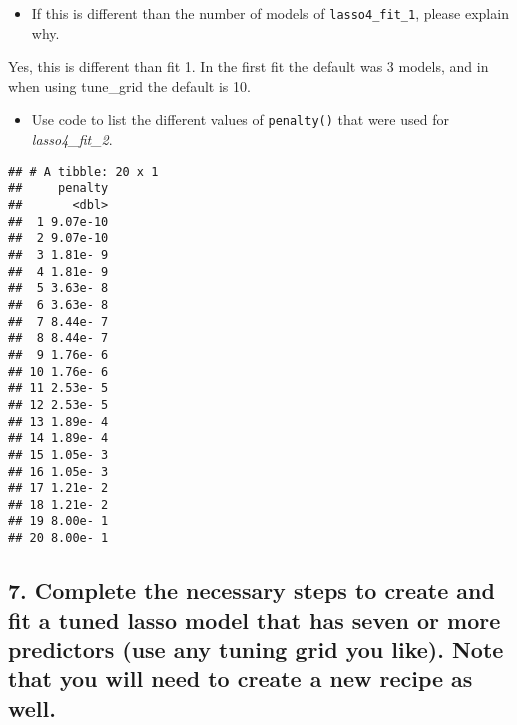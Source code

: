 \documentclass[
]{article}
\newenvironment{Shaded}{\begin{snugshade}}{\end{snugshade}}
\newcommand{\DecValTok}[1]{\textcolor[rgb]{0.00,0.00,0.81}{#1}}
\newcommand{\KeywordTok}[1]{\textcolor[rgb]{0.13,0.29,0.53}{\textbf{#1}}}
\newcommand{\NormalTok}[1]{#1}
\newcommand{\OperatorTok}[1]{\textcolor[rgb]{0.81,0.36,0.00}{\textbf{#1}}}
\newcommand{\StringTok}[1]{\textcolor[rgb]{0.31,0.60,0.02}{#1}}
\providecommand{\tightlist}{%
  \setlength{\itemsep}{0pt}\setlength{\parskip}{0pt}}
\begin{document}
\begin{itemize}
\tightlist
\item
  If this is different than the number of models of
  \texttt{lasso4\_fit\_1}, please explain why.
\end{itemize}

Yes, this is different than fit 1. In the first fit the default was 3
models, and in when using tune\_grid the default is 10.

\begin{itemize}
\tightlist
\item
  Use code to list the different values of \texttt{penalty()} that were
  used for \emph{lasso4\_fit\_2}.
\end{itemize}

\begin{Shaded}
\end{Shaded}

\begin{verbatim}
## # A tibble: 20 x 1
##     penalty
##       <dbl>
##  1 9.07e-10
##  2 9.07e-10
##  3 1.81e- 9
##  4 1.81e- 9
##  5 3.63e- 8
##  6 3.63e- 8
##  7 8.44e- 7
##  8 8.44e- 7
##  9 1.76e- 6
## 10 1.76e- 6
## 11 2.53e- 5
## 12 2.53e- 5
## 13 1.89e- 4
## 14 1.89e- 4
## 15 1.05e- 3
## 16 1.05e- 3
## 17 1.21e- 2
## 18 1.21e- 2
## 19 8.00e- 1
## 20 8.00e- 1
\end{verbatim}

\hypertarget{complete-the-necessary-steps-to-create-and-fit-a-tuned-lasso-model-that-has-seven-or-more-predictors-use-any-tuning-grid-you-like.-note-that-you-will-need-to-create-a-new-recipe-as-well.}{%
\subsection{7. Complete the necessary steps to create and fit a tuned
lasso model that has seven or more predictors (use any tuning grid you
like). Note that you will need to create a new recipe as
well.}\label{complete-the-necessary-steps-to-create-and-fit-a-tuned-lasso-model-that-has-seven-or-more-predictors-use-any-tuning-grid-you-like.-note-that-you-will-need-to-create-a-new-recipe-as-well.}}
\end{document}

